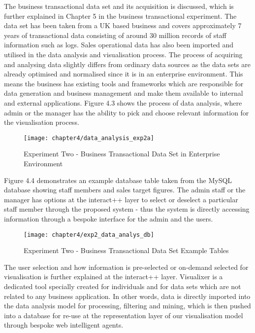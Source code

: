 The business transactional data set and its acquisition is discussed, which is further explained in Chapter 5 in the business transactional experiment. The data set has been taken from a UK based business and covers approximately 7 years of transactional data consisting of around 30 million records of staff information such as logs. Sales operational data has also been imported and utilised in the data analysis and visualisation process. The process of acquiring and analysing data slightly differs from ordinary data sources as the data sets are already optimised and normalised since it is in an enterprise environment. This means the business has existing tools and frameworks which are responsible for data generation and business management and make them available to internal and external applications. Figure 4.3 shows the process of data analysis, where admin or the manager has the ability to pick and choose relevant information for the visualisation process.

\begin{figure}[H]
\centering
\texttt{[image: chapter4/data\_analysis\_exp2a]}
\caption{Experiment Two - Business Transactional Data Set in Enterprise Environment}
\end{figure}

Figure 4.4 demonstrates an example database table taken from the MySQL database showing staff members and sales target figures. The admin staff or the manager has options at the interact++ layer to select or deselect a particular staff member through the proposed system - thus the system is directly accessing information through a bespoke interface for the admin and the users. 

\begin{figure}[H]
\centering
\texttt{[image: chapter4/exp2\_data\_analys\_db]}
\caption{Experiment Two - Business Transactional Data Set Example Tables}
\end{figure}

The user selection and how information is pre-selected or on-demand selected for visualisation is further explained at the interact++ layer. Visualixer is a dedicated tool specially created for individuals and for data sets which are not related to any business application. In other words, data is directly imported into the data analysis model for processing, filtering and mining, which is then pushed into a database for re-use at the representation layer of our visualisation model through bespoke web intelligent agents.



